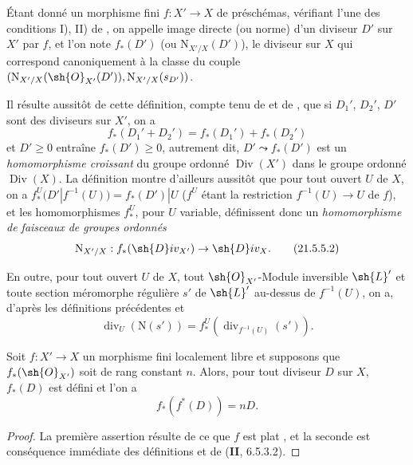 
\begin{definition}[21.5.5]
Étant donné un morphisme fini $f:X'\to X$ de préschémas, vérifiant l'une des conditions \textup{I), II)} de , on appelle image directe (ou norme) d'un diviseur $D'$ sur $X'$ par $f$, et l'on note $f_*(D')$ \textup{(}ou $\mathrm{N}_{X'/X}(D')$\textup{)}, le diviseur sur $X$ qui correspond canoniquement  à la classe du couple $(\mathrm{N}_{X'/X}(\sh{O}_{X'}(D')),\mathrm{N}_{X'/X}(s_{D'}))$.
\end{definition}

Il résulte aussitôt de cette définition, compte tenu de  et de , que si $D_1'$, $D_2'$, $D'$ sont des diviseurs sur $X'$, on a
\[
\label{IV.21.5.5.1}
  f_*(D_1'+D_2')=f_*(D_1')+f_*(D_2')
  \tag{21.5.5.1}
\]
et $D'\geq0$ entraîne $f_*(D')\geq0$, autrement dit, $D'\leadsto f_*(D')$ est un \emph{homomorphisme croissant} du groupe ordonné $\operatorname{Div}(X')$ dans le groupe ordonné $\operatorname{Div}(X)$.
La définition  montre d'ailleurs aussitôt que pour tout ouvert $U$ de $X$, on a $f_*^U(D'|f^{-1}(U))=f_*(D')|U$ ($f^U$ étant la restriction $f^{-1}(U)\to U$ de $f$), et les homomorphismes $f_*^U$, pour $U$ variable, définissent donc un \emph{homomorphisme de faisceaux de groupes ordonnés}
\[
\label{IV.21.5.5.2}
  \mathrm{N}_{X'/X}:f_*(\sh{D}iv_{X'})\to\sh{D}iv_X.
  \tag{21.5.5.2}
\]

En outre, pour tout ouvert $U$ de $X$, tout $\sh{O}_{X'}$-Module inversible $\sh{L}'$ et toute section méromorphe régulière $s'$ de $\sh{L}'$ au-dessus de $f^{-1}(U)$, on a, d'après les définitions précédentes et 
\[
\label{IV.21.5.5.3}
  \operatorname{div}_U(\mathrm{N}(s'))=f_*^U(\operatorname{div}_{f^{-1}(U)}(s')).
  \tag{21.5.5.3}
\]

\begin{proposition}[21.5.6]
\label{IV.21.5.6}
Soit $f:X'\to X$ un morphisme fini localement libre et supposons que $f_*(\sh{O}_{X'})$ soit de rang constant $n$.
Alors, pour tout diviseur $D$ sur $X$, $f_*(D)$ est défini et l'on a
\[
\label{IV.21.5.6.1}
  f_*(f^*(D))=nD.
  \tag{21.5.6.1}
\]
\end{proposition}

\begin{proof}
La première assertion résulte de ce que $f$ est plat , et la seconde est conséquence immédiate des définitions et de (\textbf{II}, 6.5.3.2).
\end{proof}

